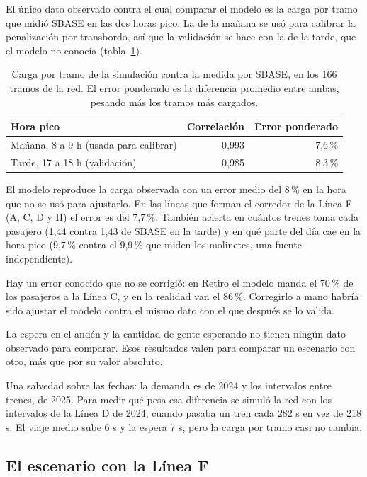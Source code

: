 \documentclass{article}
\begin{document}
El único dato observado contra el cual comparar el modelo es la carga por tramo que midió SBASE en las dos
horas pico. La de la mañana se usó para calibrar la penalización por transbordo, así que la validación se
hace con la de la tarde, que el modelo no conocía (tabla~\ref{tab:sbase}).

\begin{table}[htbp]
  \centering\small
  \caption{Carga por tramo de la simulación contra la medida por SBASE, en los 166 tramos de la red. El
  error ponderado es la diferencia promedio entre ambas, pesando más los tramos más cargados.}
  \label{tab:sbase}
  \begin{tabular}{lrr}
    \toprule
    Hora pico & Correlación & Error ponderado \\
    \midrule
    Mañana, 8 a 9 h (usada para calibrar) & 0,993 & 7,6\,\% \\
    Tarde, 17 a 18 h (validación) & 0,985 & 8,3\,\% \\
    \bottomrule
  \end{tabular}
\end{table}

El modelo reproduce la carga observada con un error medio del 8\,\% en la hora que no se usó para ajustarlo.
En las líneas que forman el corredor de la Línea F (A, C, D y H) el error es del 7,7\,\%. También acierta en
cuántos trenes toma cada pasajero (1,44 contra 1,43 de SBASE en la tarde) y en qué parte del día cae en la
hora pico (9,7\,\% contra el 9,9\,\% que miden los molinetes, una fuente independiente).

Hay un error conocido que no se corrigió: en Retiro el modelo manda el 70\,\% de los pasajeros a la Línea C,
y en la realidad van el 86\,\%. Corregirlo a mano habría sido ajustar el modelo contra el mismo dato con el
que después se lo valida.

La espera en el andén y la cantidad de gente esperando no tienen ningún dato observado para comparar. Esos
resultados valen para comparar un escenario con otro, más que por su valor absoluto.

Una salvedad sobre las fechas: la demanda es de 2024 y los intervalos entre trenes, de 2025. Para medir qué
pesa esa diferencia se simuló la red con los intervalos de la Línea D de 2024, cuando pasaba un tren cada
282 s en vez de 218 s. El viaje medio sube 6 s y la espera 7 s, pero la carga por tramo casi no cambia.

\subsection{El escenario con la Línea F}
\label{sec:escenario}
\end{document}
